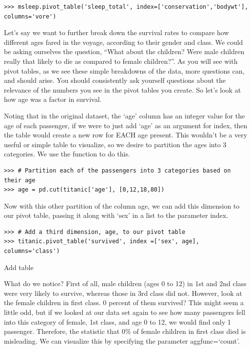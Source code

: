 \begin{lstlisting}
>>> msleep.pivot_table('sleep_total', index=['conservation','bodywt'], columns='vore')

\end{lstlisting}









Let's say we want to further break down the survival rates to compare how different ages fared in the voyage, according to their gender and class. We could be asking ourselves the question, ``What about the children? Were male children really that likely to die as compared to female children?''. As you will see with pivot tables, as we see these simple breakdowns of the data, more questions can, and should arise. You should consistently ask yourself questions about the relevance of the numbers you see in the pivot tables you create. So let's look at how age was a factor in survival.

Noting that in the original dataset, the `age' column has an integer value for the age of each passenger, if we were to just add `age' as an argument for index, then the table would create a new row for EACH age present. This wouldn't be a very useful or simple table to visualize, so we desire to partition the ages into 3 categories. We use the function  to do this.

\begin{lstlisting}
>>> # Partition each of the passengers into 3 categories based on their age
>>> age = pd.cut(titanic['age'], [0,12,18,80])
\end{lstlisting}

Now with this other partition of the column age, we can add this dimension to our pivot table, passing it along with `sex' in a list to the parameter index.

\begin{lstlisting}
>>> # Add a third dimension, age, to our pivot table
>>> titanic.pivot_table('survived', index =['sex', age], columns='class')
\end{lstlisting}

Add table

What do we notice? First of all, male children (ages 0 to 12) in 1st and 2nd class were very likely to survive, whereas those in 3rd class did not. However, look at the female children in first class. 0 percent of them survived? This might seem a little odd, but if we looked at our data set again to see how many passengers fell into this category of female, 1st class, and age 0 to 12, we would find only 1 passenger. Therefore, the statistic that 0\% of female children in first class died is misleading. We can visualize this by specifying the parameter aggfunc=`count'.

